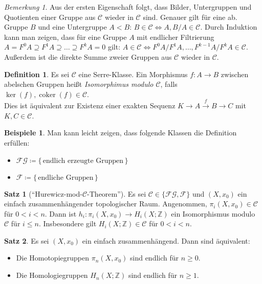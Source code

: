 \documentclass[11pt, a4paper, german]{article}
\theoremstyle{definition}
\newtheorem{satz}{Satz}
\newtheorem{defn}{Definition}
\newtheorem{bspe}{Beispiele}
\theoremstyle{remark}
\newtheorem*{bem}{Bemerkung}
\newcommand{\Z}{\mathbb{Z}} %
\DeclareMathOperator{\coker}{coker} %
\newcommand{\SC}{\mathcal{C}} %
\newcommand{\FG}{\mathcal{FG}} %
\newcommand{\F}{\mathcal{F}} %
\begin{document}
\begin{bem}
  Aus der ersten Eigenschaft folgt, dass Bilder, Untergruppen und Quotienten einer Gruppe aus $\SC$ wieder in $\SC$ sind.
  Genauer gilt für eine ab. Gruppe $B$ und eine Untergruppe $A < B$: $B \in \SC \iff A, B/A \in \SC$.
  Durch Induktion kann man zeigen, dass für eine Gruppe $A$ mit endlicher Filtrierung
  $A = F^0 A \supseteq F^1 A \supseteq \ldots \supseteq F^k A = 0$
  gilt: $A \in \SC \iff F^0 A / F^1 A, \ldots, F^{k-1} A / F^k A \in \SC$.
  Außerdem ist die direkte Summe zweier Gruppen aus $\SC$ wieder in $\SC$.
\end{bem}

\begin{defn}
  Es sei $\SC$ eine Serre-Klasse.
  Ein Morphismus $f : A \to B$ zwischen abelschen Gruppen heißt \emph{Isomorphimus modulo $\SC$}, falls $\ker(f), \coker(f) \in \SC$. \\
  Dies ist äquivalent zur Existenz einer exakten Sequenz $K \to A \xrightarrow{f} B \to C$ mit $K, C \in \SC$.
\end{defn}

\begin{bspe}
  Man kann leicht zeigen, dass folgende Klassen die Definition erfüllen:
  \begin{itemize}
    \item $\FG \coloneqq \{\, \text{endlich erzeugte Gruppen} \,\}$
    \item $\F \coloneqq \{\, \text{endliche Gruppen} \,\}$
  \end{itemize}
\end{bspe}


\begin{satz}["`Hurewicz-mod-$\SC$-Theorem"']\label{hurewicz-mod-c}
  Es sei $\SC \in \{ \FG, \F \}$ und
  $(X, x_0)$ ein einfach zusammenhängender topologischer Raum.
  Angenommen, $\pi_i(X, x_0) \in \SC$ für $0 < i < n$.
  Dann ist $h_i : \pi_i(X, x_0) \to H_i(X; \Z)$ ein Isomorphismus modulo $\SC$ für $i \leq n$.
  Insbesondere gilt $H_i(X; \Z) \in \SC$ für $0 < i < n$.
\end{satz}


\begin{satz}
  Es sei $(X, x_0)$ ein einfach zusammenhängend.
  Dann sind äquivalent:
  \begin{itemize}
    \item Die Homotopiegruppen $\pi_n(X, x_0)$ sind endlich für $n \geq 0$.
    \item Die Homologiegruppen $H_n(X; \Z)$ sind endlich für $n \geq 1$.
  \end{itemize}
\end{satz}
\end{document}
